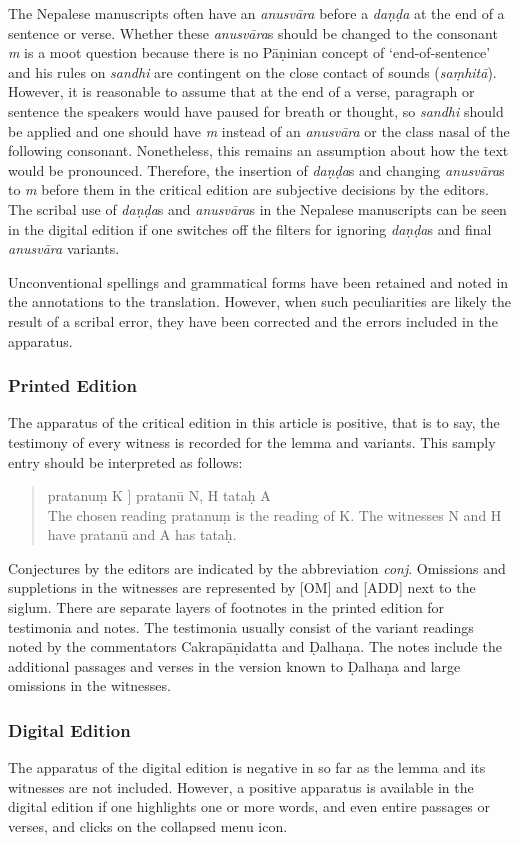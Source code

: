The Nepalese manuscripts often have an \emph{anusvāra} before a \emph{daṇḍa} at the end of a sentence or verse. Whether these \emph{anusvāra}s should be changed to the consonant \emph{m} is a moot question because there is no Pāṇinian concept of `end-of-sentence' and his rules on \emph{sandhi} are contingent on the close contact of  sounds (\emph{saṃhitā}). However, it is reasonable to assume that at the end of a verse, paragraph or sentence the speakers would have paused for breath or thought, so \emph{sandhi} should be applied and one should have \emph{m} instead of an \emph{anusvāra} or the class nasal of the following consonant.  Nonetheless, this remains an assumption about how the text would be pronounced. Therefore, the insertion of \emph{daṇḍa}s and changing \emph{anusvāra}s to \emph{m} before them in the critical edition are subjective decisions by the editors. The scribal use of \emph{daṇḍa}s and \emph{anusvāra}s in the Nepalese manuscripts can be seen in the digital edition if one switches off the filters for ignoring \emph{daṇḍa}s and final \emph{anusvāra} variants. 

Unconventional spellings and grammatical forms have been retained and noted in the annotations to the translation. However, when such peculiarities are likely the result of a scribal error, they have been corrected and the errors included in the apparatus. 

\subsubsection{Printed Edition}
The apparatus of the critical edition in this article is positive, that is to say, the testimony of every witness is recorded for the lemma and variants. This samply entry should be interpreted as follows:
\begin{quote}
pratanuṃ K ]  pratanū N, H tataḥ A\\
The chosen reading pratanuṃ is the reading of K. The witnesses N and H have pratanū and A has tataḥ.
\end{quote}
Conjectures by the editors are indicated by the abbreviation \emph{conj}. Omissions and suppletions in the witnesses are represented by \textsc{[OM]} and \textsc{[ADD]} next to the siglum. There are separate layers of footnotes in the printed edition for testimonia and notes. The testimonia usually consist of the variant readings noted by the commentators Cakrapāṇidatta and Ḍalhaṇa. The notes include the additional passages and verses in the version known to Ḍalhaṇa and large omissions in the witnesses.

\subsubsection{Digital Edition}
The apparatus of the digital edition is negative in so far as the lemma and its witnesses are not included. However, a positive apparatus is available in the digital edition if one highlights one or more words, and even entire passages or verses, and clicks on the collapsed menu icon. 




